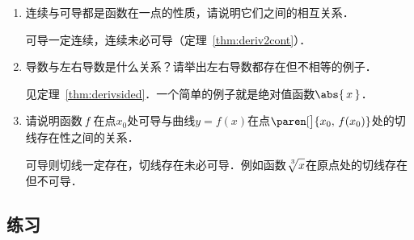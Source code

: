 \begin{enumerate}
\item 连续与可导都是函数在一点的性质，请说明它们之间的相互关系．

  \ifshowsolp
    可导一定连续，连续未必可导（定理~\ref{thm:deriv2cont}）．
  \fi

\item 导数与左右导数是什么关系？请举出左右导数都存在但不相等的例子．

  \ifshowsolp
    见定理~\ref{thm:derivsided}．一个简单的例子就是绝对值函数\(\abs{\,x\,}\)．
  \fi

\item 请说明函数\(\,f\mkern2mu\)在点\(x_0\)处可导与曲线\(y = f(x)\)在点\(\paren[\big]{x_0, \,f(x_0)}\)处的切线存在性之间的关系．

  \ifshowsolp
    可导则切线一定存在，切线存在未必可导．例如函数\(\sqrt[\leftroot{-2}\uproot{2}3]{x\mathstrut}\)在原点处的切线存在但不可导．
  \fi
\end{enumerate}

\ifshowex
{}
\subsection*{练习}
\label{B1.4.1.E}

